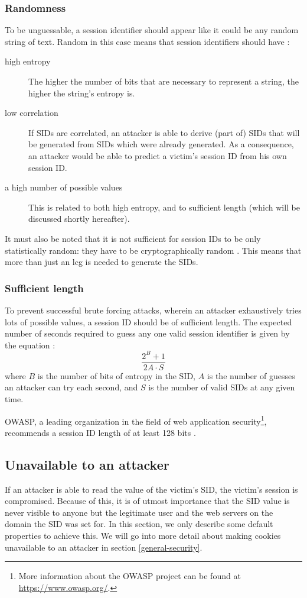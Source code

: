 \subsubsection{Randomness}
To be unguessable, a session identifier should appear like it could be any random string of text. Random in this case means that session identifiers should have \cite{Nikiforakis2010, Farrell2011, rfc4086}:
\begin{description}
	\item[high entropy] The higher the number of bits that are necessary to represent a string, the higher the string's entropy is.
	\item[low correlation] If SIDs are correlated, an attacker is able to derive (part of) SIDs that will be generated from SIDs which were already generated. As a consequence, an attacker would be able to predict a victim's session ID from his own session ID.
	\item[a high number of possible values] This is related to both high entropy, and to sufficient length (which will be discussed shortly hereafter).
\end{description}
It must also be noted that it is not sufficient for session IDs to be only statistically random: they have to be cryptographically random \cite{Fu2001}. This means that more than just an \gls{lcg} %
is needed to generate the SIDs.

\subsubsection{Sufficient length}
To prevent successful brute forcing attacks, wherein an attacker exhaustively tries lots of possible values, a session ID should be of sufficient length. The expected number of seconds required to guess any one valid session identifier is given by the equation \cite{OWASP2009a}:
\[
	\frac{2^B + 1}{2A \cdot S}
\]
where $B$ is the number of bits of entropy in the SID, $A$ is the number of guesses an attacker can try each second, and $S$ is the number of valid SIDs at any given time.

OWASP, a leading organization in the field of web application security\footnote{More information about the OWASP project can be found at \url{https://www.owasp.org/}.}, recommends a session ID length of at least 128 bits \cite{OWASP2009a}.

\subsection{Unavailable to an attacker}
If an attacker is able to read the value of the victim's SID, the victim's session is compromised. Because of this, it is of utmost importance that the SID value is never visible to anyone but the legitimate user and the web servers on the domain the SID was set for. In this section, we only describe some default properties to achieve this. We will go into more detail about making cookies unavailable to an attacker in section \ref{general-security}.

